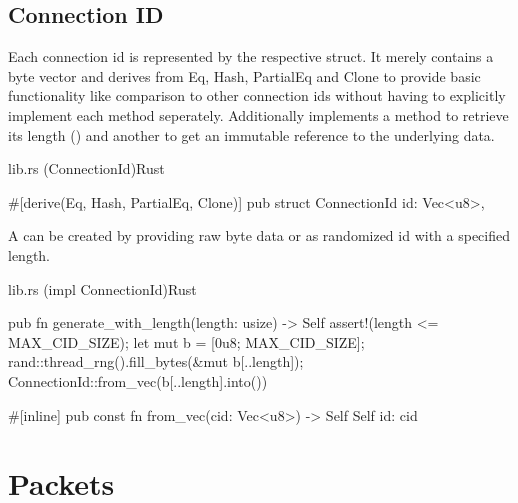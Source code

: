 \subsection{Connection ID}

Each connection id is represented by the respective  struct. It merely contains a byte vector and derives from
Eq, Hash, PartialEq and Clone to provide basic functionality like comparison to other connection ids without having to explicitly
implement each method seperately. Additionally  implements a method to retrieve its length
() and another to get an immutable reference  to the underlying data.

\begin{codeblock}{lib.rs (ConnectionId)}{Rust}
    \begin{rustcode}
        #[derive(Eq, Hash, PartialEq, Clone)]
        pub struct ConnectionId {
            id: Vec<u8>,
        }
    \end{rustcode}
    \label{connection_id}
\end{codeblock}

A  can be created by providing raw byte data or as randomized id with a specified length.

\begin{codeblock}{lib.rs (impl ConnectionId)}{Rust}
    \begin{rustcode}
        pub fn generate_with_length(length: usize) -> Self {
            assert!(length <= MAX_CID_SIZE);
            let mut b = [0u8; MAX_CID_SIZE];
            rand::thread_rng().fill_bytes(&mut b[..length]);
            ConnectionId::from_vec(b[..length].into())
        }

        #[inline]
        pub const fn from_vec(cid: Vec<u8>) -> Self {
            Self { id: cid }
        }
    \end{rustcode}
    \label{connection_id_generation}
\end{codeblock}

\section{Packets}

